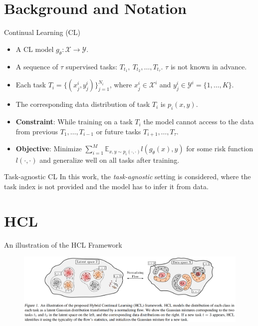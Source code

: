 \documentclass{beamer}
\begin{document}
\section{Background and Notation}
\begin{frame}{Continual Learning (CL)}
  \begin{itemize}
    \item <1-> A CL model $g_\theta : \mathcal{X} \rightarrow \mathcal{Y}$.
    \item <1-> A sequence of $\tau$ supervised tasks: $T_{t_1}, \ T_{t_2}, \dots, T_{t_\tau}$. $\tau$ is not known in advance.
    \item <1-> Each task $T_i = \{ (x_j^i, y_j^i) \}_{j = 1}^{N_i}$, where $x_j^i \in \mathcal{X}^i$ and $y_j^i \in \mathcal{Y}^i = \{ 1, \dots, K \}$.
    \item <1-> The corresponding data distribution of task $T_i$ is $p_i(x, y)$.
    \item <1-> \textbf{Constraint}: While training on a task $T_i$ the model cannot access to the data from previous $T_1, \dots, T_{i-1}$ or future tasks $T_{i+1}, \dots, T_{\tau}$.
    \item <1-> \textbf{Objective}: Minimize $\sum_{i = 1}^M \mathbb{E}_{x, y \sim p_i(\cdot, \cdot)}l(g_\theta(x), y)$ for some risk function $l(\cdot, \cdot)$ and generalize well on all tasks after training.
  \end{itemize} 
\end{frame}

\begin{frame}{Task-agnostic CL}
  In this work, the \emph{task-agnostic} setting is considered, where the task index is not provided and the model has to infer it from data.
\end{frame}

\section{HCL}
\begin{frame}{An illustration of the HCL Framework}
  \begin{figure}
    \includegraphics[width=1\textwidth]{./figures/Model_illustration}
  \end{figure}
\end{frame}
\end{document}
